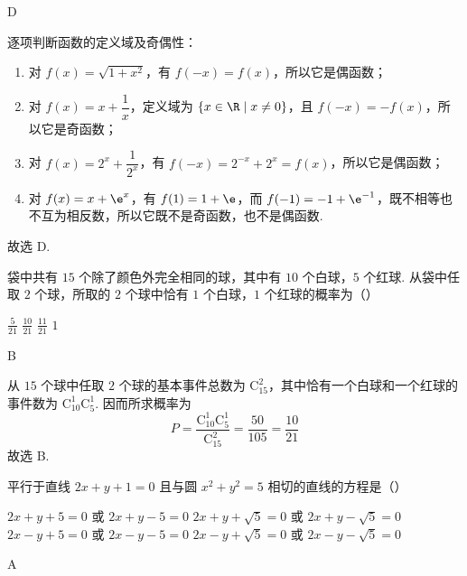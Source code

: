 \begin{answer}
D
\end{answer}

\begin{solution}
逐项判断函数的定义域及奇偶性：
\begin{enumerate}
\item 对 \(f(x)=\sqrt{1+x^2}\)，有 \(f(-x)=f(x)\)，所以它是偶函数；
\item 对 \(f(x)=x+\dfrac1x\)，定义域为 \(\{x\in\R\mid x\ne0\}\)，且 \(f(-x)=-f(x)\)，所以它是奇函数；
\item 对 \(f(x)=2^x+\dfrac1{2^x}\)，有 \(f(-x)=2^{-x}+2^x=f(x)\)，所以它是偶函数；
\item 对 \(f(x)=x+\e^x\)，有 \(f(1)=1+\e\)，而 \(f(-1)=-1+\e^{-1}\)，既不相等也不互为相反数，所以它既不是奇函数，也不是偶函数.
\end{enumerate}
故选 D.
\end{solution}

\begin{problem}
袋中共有 \(15\) 个除了颜色外完全相同的球，其中有 \(10\) 个白球，\(5\) 个红球. 从袋中任取 \(2\) 个球，所取的 \(2\) 个球中恰有 \(1\) 个白球，\(1\) 个红球的概率为（\quad）

\choices
    {\( \frac{5}{21} \)}
    {\( \frac{10}{21} \)}
    {\( \frac{11}{21} \)}
    {\(1\)}
\end{problem}

\begin{answer}
B
\end{answer}

\begin{solution}
从 \(15\) 个球中任取 \(2\) 个球的基本事件总数为 \(\mathrm C_{15}^{2}\)，其中恰有一个白球和一个红球的事件数为 \(\mathrm C_{10}^{1}\mathrm C_{5}^{1}\). 因而所求概率为
\[
P=\frac{\mathrm C_{10}^{1}\mathrm C_{5}^{1}}{\mathrm C_{15}^{2}}
 =\frac{50}{105}=\frac{10}{21}
\]
故选 B.
\end{solution}

\begin{problem}
平行于直线 \(2x + y + 1 = 0\) 且与圆 \(x^{2} + y^{2} = 5\) 相切的直线的方程是（\quad）

\choices
    {\(2x + y + 5 = 0\) 或 \(2x + y - 5 = 0\)}
    {\(2x + y + \sqrt{5} = 0\) 或 \(2x + y - \sqrt{5} = 0\)}
    {\(2x - y + 5 = 0\) 或 \(2x - y - 5 = 0\)}
    {\(2x - y + \sqrt{5} = 0\) 或 \(2x - y - \sqrt{5} = 0\)}
\end{problem}

\begin{answer}
A
\end{answer}

